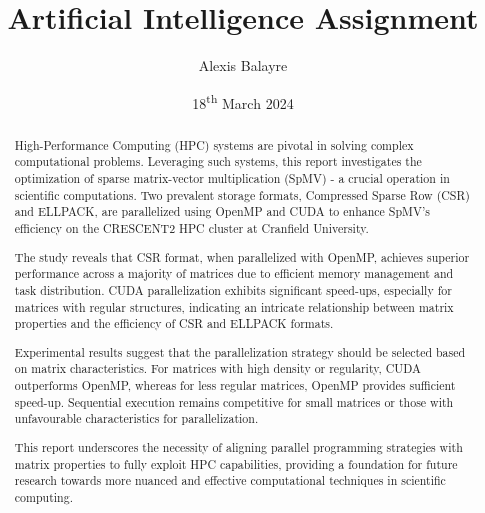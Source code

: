 \documentclass[12pt,oneside]{book} %
\title{Artificial Intelligence Assignment}
\author{Alexis Balayre}
\date{18\textsuperscript{th} March 2024}
\begin{document}
\frontmatter

\maketitle

\begin{abstract}

    High-Performance Computing (HPC) systems are pivotal in solving complex
    computational problems. Leveraging such systems, this report investigates the
    optimization of sparse matrix-vector multiplication (SpMV) - a crucial
    operation in scientific computations. Two prevalent storage formats, Compressed
    Sparse Row (CSR) and ELLPACK, are parallelized using OpenMP and CUDA to enhance
    SpMV's efficiency on the CRESCENT2 HPC cluster at Cranfield University.

    The study reveals that CSR format, when parallelized with OpenMP, achieves
    superior performance across a majority of matrices due to efficient memory
    management and task distribution. CUDA parallelization exhibits significant
    speed-ups, especially for matrices with regular structures, indicating an
    intricate relationship between matrix properties and the efficiency of CSR and
    ELLPACK formats.

    Experimental results suggest that the parallelization strategy should be
    selected based on matrix characteristics. For matrices with high density or
    regularity, CUDA outperforms OpenMP, whereas for less regular matrices, OpenMP
    provides sufficient speed-up. Sequential execution remains competitive for
    small matrices or those with unfavourable characteristics for parallelization.

    This report underscores the necessity of aligning parallel programming
    strategies with matrix properties to fully exploit HPC capabilities, providing
    a foundation for future research towards more nuanced and effective
    computational techniques in scientific computing.

\end{abstract}

{
\clearpage
\singlespacing
{
    \tableofcontents
}
\clearpage

\listoffigures

\listoftables
}

\mainmatter
\pagestyle{fancy}
\fancyhead[L]{\nouppercase{\leftmark}}
\fancyhead[R]{\nouppercase{\rightmark}}
\end{document}
